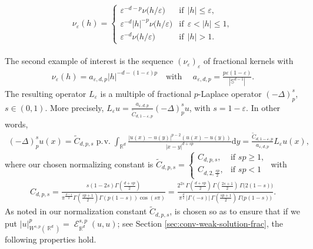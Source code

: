 \documentclass[12pt, reqno]{amsart}%
\theoremstyle{plain}  %
\theoremstyle{definition}  %
\numberwithin{equation}{section}
\DeclareMathOperator{\pv}{\operatorname{p.\!v.}}
\DeclareMathOperator{\cE}{\mathcal{E}}
\DeclareMathOperator{\R}{\mathbb{R}}
\renewcommand{\d}{\mathrm{d}}
\newcommand{\eps}{\varepsilon}
\begin{document}
%
\begin{align*}
\begin{split}
\nu_\eps(h) =
\begin{cases}
\eps^{-d-p}\nu\big(h/\varepsilon\big)& \text{if}~~|h|\leq \varepsilon,\\
\eps^{-d}|h|^{-p}\nu\big(h/\varepsilon\big)& \text{if}~~\varepsilon<|h|\leq 1,\\
\eps^{-d}\nu\big(h/\varepsilon\big)& \text{if}~~|h|>1.
\end{cases}
\end{split}
\end{align*}

\noindent The second example of interest is the sequence $(\nu_\eps)_\eps$ of fractional kernels with
\begin{align*}
\nu_\eps(h) = a_{\varepsilon, d,p} |h|^{-d-(1-\eps)p}\quad\text{with }\quad a_{\varepsilon, d,p} = \frac{p\eps(1-\eps)}{|\mathbb{S}^{d-1}|}.
\end{align*}
The resulting operator $L_\eps$ is a multiple of fractional $p$-Laplace operator $(-\Delta)^s_p$, $s\in (0,1)$. More precisely, $L_\eps u= \frac{a_{\eps,d,p}}{\widetilde{C}_{d,1-\eps,p}} (-\Delta)^s_pu$, with $s=1-\eps$. In other words,
 \begin{align*}
(-\Delta)_p^s u(x)	=\widetilde{C}_{d,p,s}\pv \int_{\R^d}\frac{|u(x)-u(y)|^{p-2}(u(x)-u(y))}{|x-y|^{d+sp}}\d y = \tfrac{\widetilde{C}_{d,1-\eps,p}}{ a_{\eps,d,p}}L_\eps u(x),
\end{align*}
where our chosen normalizing constant is
{\tiny
$\widetilde{C}_{d,p,s} =
\begin{cases}
C_{d,p,s}, & \text{if } sp \ge 1, \\
C_{d,2,\frac{sp}{2}}, & \text{if } sp < 1
\end{cases}
$} with
\begin{align*}
C_{d,p,s}=\frac{s(1-2s)\Gamma(\frac{d+sp}{2})}{\pi^{\frac{d-1}{2}}\Gamma(\frac{sp+1}{2})\Gamma(p(1-s)) \cos(s\pi)}=
\frac{
2^{2s}\,\Gamma\!\left(\frac{d+sp}{2}\right)
\,\Gamma\!\left(\frac{2s+1}{2}\right)
\,\Gamma\!\bigl(2(1-s)\bigr)
}{
\pi^{\frac{d}{2}}
\,\bigl|\Gamma(-s)\bigr|
\,\Gamma\!\left(\frac{sp+1}{2}\right)
\,\Gamma\!\bigl(p(1-s)\bigr)
}.
\end{align*}
As noted in \cite{Fog25,Fog26} our normalization constant $\widetilde{C}_{d,p,s}$,  is chosen so as to ensure that if we put $|u|^p_{W^{s,p}(\R^d)}= \cE_{\R^d}^{s,p}(u,u)$; see Section \ref{sec:conv-weak-solution-frac}, the following properties hold.
\end{document}
